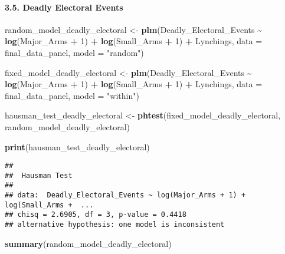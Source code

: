 \documentclass[
  11pt,
]{article}
\newenvironment{Shaded}{\begin{snugshade}}{\end{snugshade}}
\newcommand{\AttributeTok}[1]{\textcolor[rgb]{0.13,0.29,0.53}{#1}}
\newcommand{\DecValTok}[1]{\textcolor[rgb]{0.00,0.00,0.81}{#1}}
\newcommand{\FunctionTok}[1]{\textcolor[rgb]{0.13,0.29,0.53}{\textbf{#1}}}
\newcommand{\NormalTok}[1]{#1}
\newcommand{\OtherTok}[1]{\textcolor[rgb]{0.56,0.35,0.01}{#1}}
\newcommand{\SpecialCharTok}[1]{\textcolor[rgb]{0.81,0.36,0.00}{\textbf{#1}}}
\newcommand{\StringTok}[1]{\textcolor[rgb]{0.31,0.60,0.02}{#1}}
\begin{document}
\paragraph{3.5. Deadly Electoral Events}\label{deadly-electoral-events}

\begin{Shaded}
\begin{Highlighting}[]
\NormalTok{random\_model\_deadly\_electoral }\OtherTok{\textless{}{-}} \FunctionTok{plm}\NormalTok{(Deadly\_Electoral\_Events }\SpecialCharTok{\textasciitilde{}} \FunctionTok{log}\NormalTok{(Major\_Arms }\SpecialCharTok{+} \DecValTok{1}\NormalTok{) }\SpecialCharTok{+} \FunctionTok{log}\NormalTok{(Small\_Arms }\SpecialCharTok{+} \DecValTok{1}\NormalTok{) }\SpecialCharTok{+}\NormalTok{ Lynchings,                                       }\AttributeTok{data =}\NormalTok{ final\_data\_panel, }\AttributeTok{model =} \StringTok{"random"}\NormalTok{)}

\NormalTok{fixed\_model\_deadly\_electoral }\OtherTok{\textless{}{-}} \FunctionTok{plm}\NormalTok{(Deadly\_Electoral\_Events }\SpecialCharTok{\textasciitilde{}} \FunctionTok{log}\NormalTok{(Major\_Arms }\SpecialCharTok{+} \DecValTok{1}\NormalTok{) }\SpecialCharTok{+} \FunctionTok{log}\NormalTok{(Small\_Arms }\SpecialCharTok{+} \DecValTok{1}\NormalTok{) }\SpecialCharTok{+}\NormalTok{ Lynchings,                                      }\AttributeTok{data =}\NormalTok{ final\_data\_panel, }\AttributeTok{model =} \StringTok{"within"}\NormalTok{)}

\NormalTok{hausman\_test\_deadly\_electoral }\OtherTok{\textless{}{-}} \FunctionTok{phtest}\NormalTok{(fixed\_model\_deadly\_electoral, random\_model\_deadly\_electoral)}

\FunctionTok{print}\NormalTok{(hausman\_test\_deadly\_electoral)  }
\end{Highlighting}
\end{Shaded}

\begin{verbatim}
## 
##  Hausman Test
## 
## data:  Deadly_Electoral_Events ~ log(Major_Arms + 1) + log(Small_Arms +  ...
## chisq = 2.6905, df = 3, p-value = 0.4418
## alternative hypothesis: one model is inconsistent
\end{verbatim}

\begin{Shaded}
\begin{Highlighting}[]
\FunctionTok{summary}\NormalTok{(random\_model\_deadly\_electoral)}
\end{Highlighting}
\end{Shaded}
\end{document}
